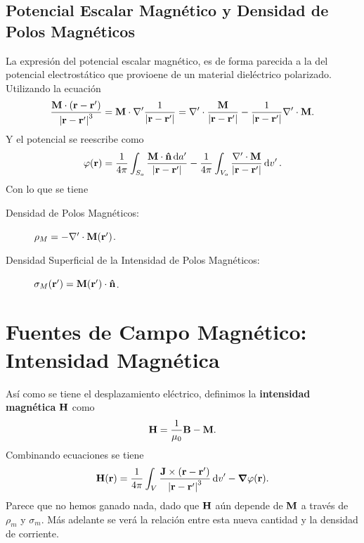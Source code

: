 \subsection{Potencial Escalar Magnético y Densidad de Polos Magnéticos}
La expresión del potencial escalar magnético, es de forma parecida a la del potencial electrostático que provioene de un material dieléctrico polarizado. Utilizando la ecuación
\begin{equation}
	\frac{\vb{M} \cdot (\vb{r} - \vb{r}^\prime)}{\abs{\vb{r} - \vb{r} ^\prime}^3} = \vb{M} \cdot \nabla ^\prime \frac{1}{\abs{\vb{r} - \vb{r} ^\prime}} = \nabla ^\prime \cdot \frac{\vb{M}}{\abs{\vb{r} - \vb{r} ^\prime}} - \frac{1}{\abs{\vb{r} - \vb{r} ^\prime}} \nabla ^\prime \cdot \vb{M} .
\end{equation}
Y el potencial se reescribe como
\begin{equation}
	\varphi (\vb{r}) = \frac{1}{4\pi} \int _{S_o} \frac{\vb{M} \cdot \vu{n} \dd{a^\prime}}{\abs{\vb{r} - \vb{r}^\prime}} - \frac{1}{4\pi} \int _{V_o} \frac{\nabla ^\prime \cdot \vb{M}}{\abs{\vb{r} - \vb{r}^\prime}} \dd{v^\prime}.
\end{equation}
Con lo que se tiene
\begin{description}
	\item[Densidad de Polos Magnéticos: ] $\rho _M = -\nabla ^\prime \cdot \vb{M} (\vb{r} ^\prime)$.
	\item[Densidad Superficial de la Intensidad de Polos Magnéticos: ] $\sigma _M (\vb{r} ^\prime) = \vb{M} (\vb{r}^\prime) \cdot \vu{n}$.
\end{description}

\section{Fuentes de Campo Magnético: Intensidad Magnética}
Así como se tiene el desplazamiento eléctrico, definimos la \textbf{intensidad magnética} $\vb{H}$ como
\begin{equation}
	\vb{H} = \frac{1}{\mu_0} \vb{B} - \vb{M}.
\end{equation}
Combinando ecuaciones se tiene
\begin{equation}
	\vb{H} (\vb{r}) = \frac{1}{4\pi} \int _V \frac{\vb{J} \times (\vb{r} - \vb{r} ^\prime)}{\abs{\vb{r} - \vb{r} ^\prime}^3} \dd{v}^\prime - \grad{\varphi} (\vb{r}).
\end{equation}
Parece que no hemos ganado nada, dado que $\vb{H}$ aún depende de $\vb{M}$ a través de $\rho _m$ y $\sigma _m$. Más adelante se verá la relación entre esta nueva cantidad y la densidad de corriente. 


